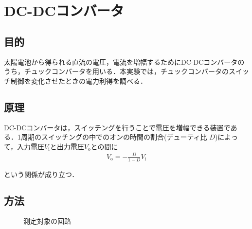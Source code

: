 \documentclass[1_power_supply.tex]{subfiles}
\begin{document}
\section{DC-DCコンバータ}

  \subsection{目的}

    太陽電池から得られる直流の電圧，電流を増幅するためにDC-DCコンバータのうち，チュックコンバータを用いる．本実験では，チュックコンバータのスイッチ制御を変化させたときの電力利得を調べる．

  \subsection{原理}

    DC-DCコンバータは，スイッチングを行うことで電圧を増幅できる装置である．1周期のスイッチングの中でのオンの時間の割合(デューティ比 $D$)によって，入力電圧$V_\mathrm{i}$と出力電圧$V_\mathrm{o}$との間に
    \begin{align}
      V_\mathrm{o} = -\frac{D}{1-D}V_\mathrm{i}
    \end{align}

    という関係が成り立つ．

  \subsection{方法}


    \begin{figure}[htbp]
      \begin{center}
        \caption{測定対象の回路}\label{fig:1_4}
      \end{center}
    \end{figure}
\end{document}
